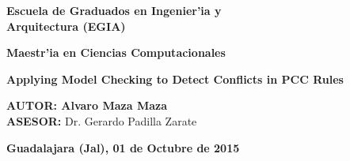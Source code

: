 \begin{center}
\Large
\textbf{Escuela de Graduados en Ingenier'ia y\\ Arquitectura (EGIA)}\\
\vspace{20 pt}

\textbf{Maestr'ia en Ciencias Computacionales}\\
\vspace{35 pt}

\Huge
\textbf{Applying Model Checking to Detect Conflicts in PCC Rules}\\
\vspace{50 pt}

\Large
\begin{flushleft}
\hspace{5pt}\textbf{AUTOR: \hspace{4pt}Alvaro Maza Maza}\\
\vspace{5pt}
\hspace{5pt}\textbf{ASESOR:} Dr. Gerardo Padilla Zarate \\
\end{flushleft}

\large
\vspace{15pt}
\textbf{Guadalajara (Jal), 01 de Octubre de 2015}
\end{center}
\clearpage

\renewcommand{\baselinestretch}{1.5}